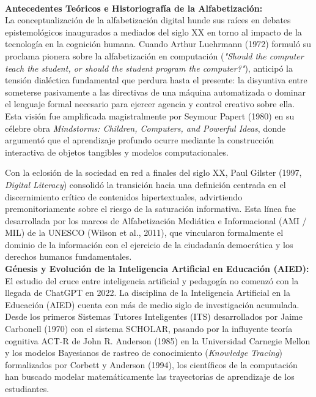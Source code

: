 \newpage

\newpage
{}
\vspace*{0.8cm}
\\[0.8cm]

\textbf{Antecedentes Teóricos e Historiografía de la Alfabetización:}\\[0.2cm]
La conceptualización de la alfabetización digital hunde sus raíces en debates epistemológicos inaugurados a mediados del siglo XX en torno al impacto de la tecnología en la cognición humana. Cuando Arthur Luehrmann (1972) formuló su proclama pionera sobre la alfabetización en computación (\textit{"Should the computer teach the student, or should the student program the computer?"}), anticipó la tensión dialéctica fundamental que perdura hasta el presente: la disyuntiva entre someterse pasivamente a las directivas de una máquina automatizada o dominar el lenguaje formal necesario para ejercer agencia y control creativo sobre ella. Esta visión fue amplificada magistralmente por Seymour Papert (1980) en su célebre obra \textit{Mindstorms: Children, Computers, and Powerful Ideas}, donde argumentó que el aprendizaje profundo ocurre mediante la construcción interactiva de objetos tangibles y modelos computacionales.

Con la eclosión de la sociedad en red a finales del siglo XX, Paul Gilster (1997, \textit{Digital Literacy}) consolidó la transición hacia una definición centrada en el discernimiento crítico de contenidos hipertextuales, advirtiendo premonitoriamente sobre el riesgo de la saturación informativa. Esta línea fue desarrollada por los marcos de Alfabetización Mediática e Informacional (AMI / MIL) de la UNESCO (Wilson et al., 2011), que vincularon formalmente el dominio de la información con el ejercicio de la ciudadanía democrática y los derechos humanos fundamentales.\\[0.4cm]

\textbf{Génesis y Evolución de la Inteligencia Artificial en Educación (AIED):}\\[0.2cm]
El estudio del cruce entre inteligencia artificial y pedagogía no comenzó con la llegada de ChatGPT en 2022. La disciplina de la Inteligencia Artificial en la Educación (AIED) cuenta con más de medio siglo de investigación acumulada. Desde los primeros Sistemas Tutores Inteligentes (ITS) desarrollados por Jaime Carbonell (1970) con el sistema SCHOLAR, pasando por la influyente teoría cognitiva ACT-R de John R. Anderson (1985) en la Universidad Carnegie Mellon y los modelos Bayesianos de rastreo de conocimiento (\textit{Knowledge Tracing}) formalizados por Corbett y Anderson (1994), los científicos de la computación han buscado modelar matemáticamente las trayectorias de aprendizaje de los estudiantes.

